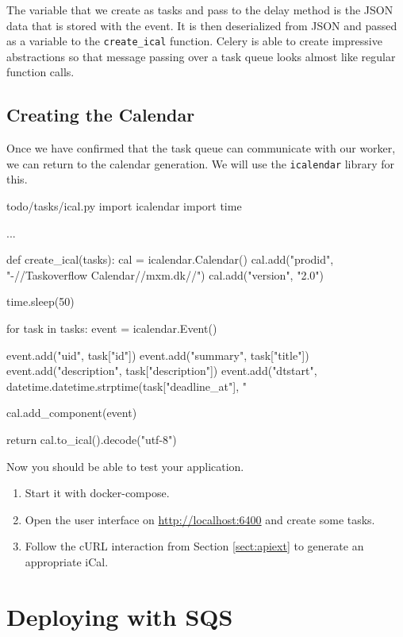 \documentclass{csse4400}
\begin{document}
The variable that we create as tasks and pass to the delay method is the JSON data that is stored with the event.
It is then deserialized from JSON and passed as a variable to the \texttt{create\_ical} function.
Celery is able to create impressive abstractions so that message passing over a task queue looks almost like regular function calls.

\subsection{Creating the Calendar}

Once we have confirmed that the task queue can communicate with our worker,
we can return to the calendar generation.
We will use the \texttt{icalendar} library for this.


\begin{code}[language=python,numbers=none]{todo/tasks/ical.py}
import icalendar
import time

...

def create_ical(tasks):
    cal = icalendar.Calendar()
    cal.add("prodid", "-//Taskoverflow Calendar//mxm.dk//")
    cal.add("version", "2.0")

    time.sleep(50)

    for task in tasks:
        event = icalendar.Event()
        
        event.add("uid", task["id"])
        event.add("summary", task["title"])
        event.add("description", task["description"])
        event.add("dtstart", datetime.datetime.strptime(task["deadline_at"], "%

        cal.add_component(event)

    return cal.to_ical().decode("utf-8")
\end{code}

Now you should be able to test your application.
\begin{enumerate}
    \item Start it with docker-compose.
    \item Open the user interface on \url{http://localhost:6400} and create some tasks.
    \item Follow the cURL interaction from Section \ref{sect:apiext} to generate an appropriate iCal.
\end{enumerate}

\section{Deploying with SQS}
\end{document}
